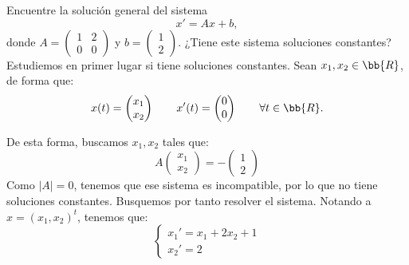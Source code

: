 \documentclass[12pt]{article}
\begin{document}
    \begin{ejercicio}
        Encuentre la solución general del sistema
        \begin{equation*}
            x'=Ax+b,
        \end{equation*}
        donde $A=\begin{pmatrix}
            1 & 2\\
            0 & 0
        \end{pmatrix}$ y $b=\begin{pmatrix}
            1\\
            2
        \end{pmatrix}$. ¿Tiene este sistema soluciones constantes?\\

        Estudiemos en primer lugar si tiene soluciones constantes. Sean $x_1,x_2\in \bb{R}$, de forma que:
        \begin{equation*}
            x(t)=\begin{pmatrix}
                x_1\\
                x_2
            \end{pmatrix}
            \qquad x'(t)=\begin{pmatrix}
                0\\
                0
            \end{pmatrix}
            \qquad \forall t\in\bb{R}.
        \end{equation*}

        De esta forma, buscamos $x_1,x_2$ tales que:
        \begin{equation*}
            A\begin{pmatrix}
                x_1\\
                x_2
            \end{pmatrix}=-\begin{pmatrix}
                1\\
                2
            \end{pmatrix}
        \end{equation*}
        Como $|A|=0$, tenemos que ese sistema es incompatible, por lo que no tiene soluciones constantes. Busquemos por tanto resolver el sistema. Notando a $x=(x_1,x_2)^t$, tenemos que:
        \begin{equation*}
            \begin{cases}
                x_1'=x_1+2x_2+1\\
                x_2'=2
            \end{cases}
        \end{equation*}


\end{ejercicio}
\end{document}
